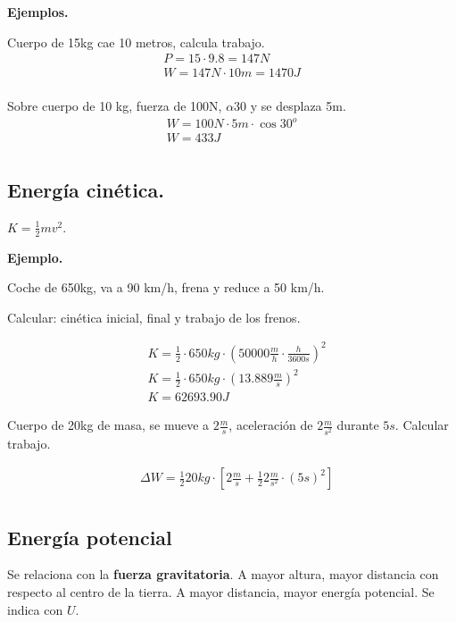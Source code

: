 \documentclass{article}
\begin{document}
\textbf{Ejemplos.}

Cuerpo de 15kg cae 10 metros, calcula trabajo.
\begin{align*}
    P = 15 \cdot 9.8 = 147 N      \\
    W = 147 N \cdot 10 m = 1470 J \\
\end{align*}

Sobre cuerpo de 10 kg, fuerza de 100N, \(\alpha 30\) y se desplaza 5m.
\begin{align*}
    W = 100N \cdot 5m \cdot \cos 30^o \\
    W = 433 J                         \\
\end{align*}

\subsection{Energía cinética.}

\(K = \frac{1}{2}mv^2\).

\textbf{Ejemplo.}

Coche de 650kg,
va a 90 km/h,
frena y reduce a 50 km/h.

Calcular: cinética inicial, final y trabajo de los frenos.

\begin{align*}
     & K = \frac{1}{2} \cdot 650kg \cdot (50000 \frac{m}{h} \cdot \frac{h}{3600 s})^2 \\
     & K = \frac{1}{2} \cdot 650kg \cdot (13.889 \frac{m}{s})^2                       \\
     & \boxed{K = 62693.90 J}
\end{align*}

Cuerpo de 20kg de masa,
se mueve a \(2\frac{m}{s}\),
aceleración de \(2\frac{m}{s^2}\) durante \(5s\).
Calcular trabajo.

\begin{align*}
     & \Delta W = \frac{1}{2} 20kg \cdot \left[2\frac{m}{s} + \frac{1}{2} 2\frac{m}{s^2} \cdot (5s)^2\right] \\
\end{align*}

\subsection{Energía potencial}

Se relaciona con la \textbf{fuerza gravitatoria}.
A mayor altura, mayor distancia con respecto al centro de la tierra.
A mayor distancia, mayor energía potencial.
Se indica con \(U\).
\end{document}
